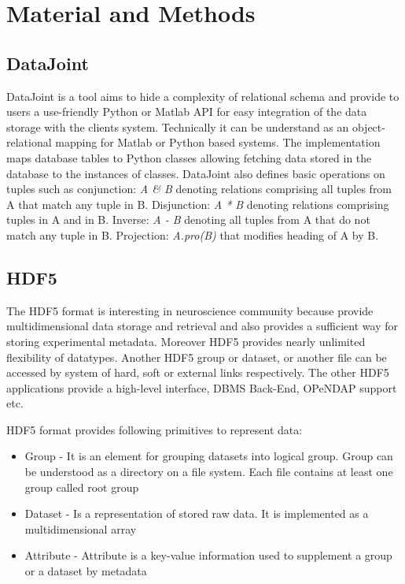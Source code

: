 \documentclass[utf8]{frontiersSCNS} %
\begin{document}
\section{Material and Methods}
\label{materials_and_methods}


\subsection{DataJoint}
\label{DataJoint}

DataJoint \citep{Yatsenko031658} is a tool aims to hide a complexity of relational schema and provide to users a use-friendly Python or Matlab API for easy integration of the data storage with the clients system. Technically it can be understand as an object-relational mapping \citep{Keith2010} for Matlab or Python based systems. The implementation maps database tables to Python classes allowing fetching data stored in the database to the instances of classes. DataJoint also defines basic operations on tuples such as conjunction: \emph{A \& B} denoting relations comprising all tuples from A that match any tuple in B. Disjunction: \emph{A * B} denoting relations comprising tuples in A and in B. Inverse: \emph{A - B} denoting all tuples from A that do not match any tuple in B. Projection: \emph{A.pro(B)} that modifies heading of A by B.

\subsection{HDF5}
\label{HDF5}

The HDF5 format is interesting in neuroscience community because provide multidimensional data storage and retrieval and also provides a sufficient way for storing experimental metadata. Moreover HDF5 provides nearly unlimited flexibility of datatypes. Another HDF5 group or dataset, or another file can be accessed by system of hard, soft or external links respectively. The other HDF5 applications \citep{Folk:2011:OHT:1966895.1966900} provide a high-level interface, DBMS Back-End, OPeNDAP support etc.


HDF5 format \citep{Koziol2011} provides following primitives to represent data:

\begin{itemize}
 \item Group - It is an element for grouping datasets into logical group. Group can be understood as a directory on a file system. Each file contains at least one group called root group
 \item Dataset - Is a representation of stored raw data. It is implemented as a multidimensional array 
 \item Attribute - Attribute is a key-value information used to supplement a group or a dataset by metadata
\end{itemize}
\end{document}
